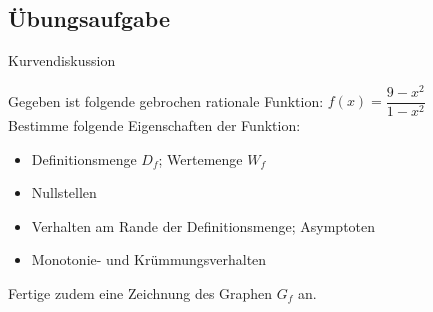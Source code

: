 
\subsection{Übungsaufgabe}

\begin{Exercise}{Kurvendiskussion}{}

    Gegeben ist folgende gebrochen rationale Funktion: \qquad $f(x) = \dfrac{9-x^2}{1-x^2}$\\

    Bestimme folgende Eigenschaften der Funktion:
    \begin{itemize}
        \item Definitionsmenge $D_f$; Wertemenge $W_f$
        \item Nullstellen
        \item Verhalten am Rande der Definitionsmenge; Asymptoten
        \item Monotonie- und Krümmungsverhalten
    \end{itemize}

    Fertige zudem eine Zeichnung des Graphen $G_{f}$ an.

\end{Exercise}
\vspace{1ex}

